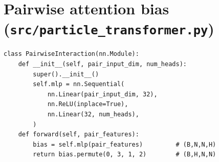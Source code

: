 \documentclass[12pt,a4paper,oneside]{report}
\begin{document}
\section{Pairwise attention bias (\texttt{src/particle\_transformer.py})}
{\footnotesize
\begin{verbatim}
class PairwiseInteraction(nn.Module):
    def __init__(self, pair_input_dim, num_heads):
        super().__init__()
        self.mlp = nn.Sequential(
            nn.Linear(pair_input_dim, 32),
            nn.ReLU(inplace=True),
            nn.Linear(32, num_heads),
        )
    def forward(self, pair_features):
        bias = self.mlp(pair_features)         # (B,N,N,H)
        return bias.permute(0, 3, 1, 2)        # (B,H,N,N)
\end{verbatim}}
\end{document}
